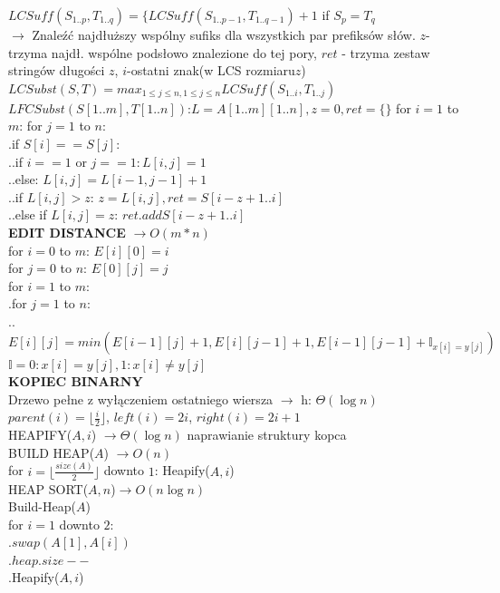 \documentclass[8pt,a3paper]{article}
\begin{document}
\begin{multicols*}{3}
	 $LCSuff(S_{1..p},T_{1..q})=\{LCSuff(S_{1..p-1},T_{1..q-1})+1$ if $S_{p}=T_{q}$\\
	 $\to$ Znaleźć najdłuższy wspólny sufiks dla wszystkich par prefiksów słów. $z$- trzyma najdł. wspólne podsłowo znalezione do tej pory, $ret$ - trzyma zestaw stringów długości $z$, $i$-ostatni znak(w LCS rozmiaru$z$)\\
	 $LCSubst(S,T)=max_{1\leq j\leq n, 1 \leq j \leq n}LCSuff(S_{1..i},T_{1..j})$\\
	 $LFCSubst(S[1..m],T[1..n])$:$L= A[1..m][1..n], z=0, ret=\{\}$ for $i=1$ to $m$: for $j=1$ to $n:$\\
	 .\quad if $S[i]==S[j]$: \\
	 .\quad.\quad if $i==1$ or $j==1: L[i,j]=1$\\
	 .\quad.\quad else: $L[i,j] = L[i-1,j-1]+1$\\
	 .\quad .\quad if $L[i,j]>z$: $z=L[i,j], ret={S[i-z+1..i]}$\\
	 .\quad .\quad else if $L[i,j] = z$: $ret.add{S[i-z+1..i]}$\\
	 \textbf{EDIT DISTANCE} $\to O(m*n)$ \\
	 for $i=0$ to $m$: $E[i][0] = i$ \\
	 for $j=0$ to $n$: $E[0][j] = j$ \\
	 for $i=1$ to $m$: \\
	 .\quad for $j=1$ to $n$: \\
	 .\quad .\quad $E[i][j] = min(E[i-1][j]+1, E[i][j-1]+1, E[i-1][j-1]+\mathbb{I} _{x[i]=y[j]})$ \quad $\mathbb{I} = 0: x[i] = y[j], 1: x[i] \neq y[j]$\\
	 \textbf{KOPIEC BINARNY} \\
	 Drzewo pełne z wyłączeniem ostatniego wiersza $\to$ h: $\Theta(\log n)$ \\
	 $parent(i) = \lfloor \frac{i}{2} \rfloor$, $left(i)=2i$, $right(i)=2i+1$ \\
	 HEAPIFY($A,i$) $\to \Theta(\log n)$ naprawianie struktury kopca \\
	 BUILD HEAP($A$) $\to O(n)$ \\
	 for $i=\lfloor \frac{size(A)}{2} \rfloor$ downto $1$: Heapify($A,i$) \\
	 HEAP SORT($A,n$)$\to O(n \log n)$ \\
	 Build-Heap($A$) \\
	 for $i=1$ downto $2$: \\
	 .\quad $swap(A[1],A[i])$ \\
	 .\quad $heap.size --$ \\
	 .\quad Heapify($A,i$) \\ 

\end{multicols*}
\end{document}
